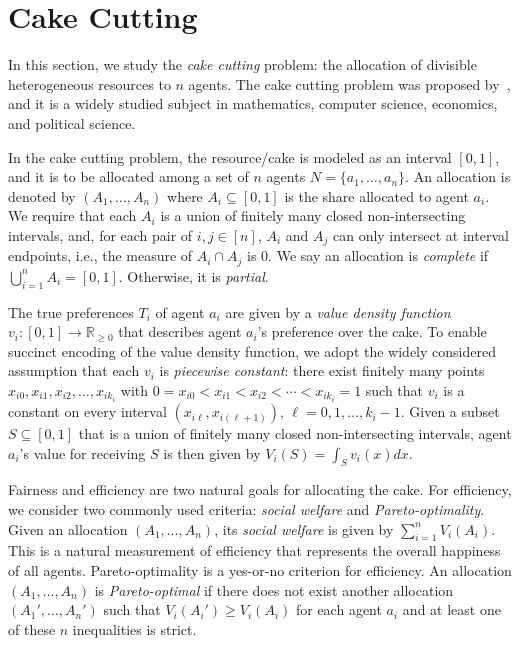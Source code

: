 \section{Cake Cutting}
\label{sec:cake-cutting}
In this section, we study the \emph{cake cutting} problem: the allocation of divisible heterogeneous resources to $n$ agents.
The cake cutting problem was proposed by~\citet{Steinhaus48,Steinhaus49}, and it is a widely studied subject in mathematics, computer science, economics, and political science.

In the cake cutting problem, the resource/cake is modeled as an interval $[0,1]$, and it is to be allocated among a set of $n$ agents $N=\{a_1,\ldots,a_n\}$.
An allocation is denoted by $(A_1,\ldots,A_n)$ where $A_i\subseteq[0,1]$ is the share allocated to agent $a_i$.
We require that each $A_i$ is a union of finitely many closed non-intersecting intervals, and, for each pair of $i,j\in[n]$, $A_i$ and $A_j$ can only intersect at interval endpoints, i.e., the measure of $A_i\cap A_j$ is $0$.
We say an allocation is \emph{complete} if $\bigcup_{i=1}^nA_i=[0,1]$.
Otherwise, it is \emph{partial}.

The true preferences $T_i$ of agent $a_i$ are given by  a \emph{value density function} $v_i:[0,1]\to\mathbb{R}_{\geq0}$ that describes agent $a_i$'s preference over the cake.
To enable succinct encoding of the value density function, we adopt the widely considered assumption that each $v_i$ is \emph{piecewise constant}: there exist finitely many points $x_{i0},x_{i1},x_{i2},\ldots,x_{ik_i}$ with $0=x_{i0}<x_{i1}<x_{i2}<\cdots<x_{ik_i}=1$ such that $v_i$ is a constant on every interval $(x_{i\ell},x_{i(\ell+1)})$, $\ell=0,1,\ldots,k_i-1$.
Given a subset $S\subseteq[0,1]$ that is a union of finitely many closed non-intersecting intervals, agent $a_i$'s value for receiving $S$ is then given by
$V_i(S)=\int_Sv_i(x)dx.$

Fairness and efficiency are two natural goals for allocating the cake.
For efficiency, we consider two commonly used criteria: \emph{social welfare} and \emph{Pareto-optimality}.
Given an allocation $(A_1,\ldots,A_n)$, its \emph{social welfare} is given by
$\sum_{i=1}^nV_i(A_i)$.
This is a natural measurement of efficiency that represents the overall happiness of all agents.
Pareto-optimality is a yes-or-no criterion for efficiency.
An allocation $(A_1,\ldots,A_n)$ is \emph{Pareto-optimal} if there does not exist another allocation $(A_1',\ldots,A_n')$ such that $V_i(A_i')\geq V_i(A_i)$ for each agent $a_i$ and at least one of these $n$ inequalities is strict.

